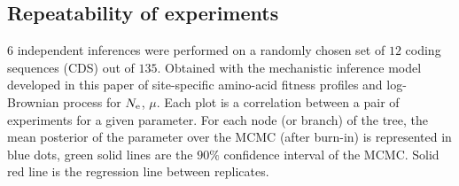 \documentclass{article}
\begin{document}
	\subsection{Repeatability of experiments}
	\label{subsec:repeatability-of-experiments-isopods}
	$6$ independent inferences were performed on a randomly chosen set of $12$ coding sequences ({CDS}) out of $135$.
	Obtained with the mechanistic inference model developed in this paper of site-specific amino-acid fitness profiles and log-Brownian process for $N_{\text{e}}$, $\mu$.
	Each plot is a correlation between a pair of experiments for a given parameter.
	For each node (or branch) of the tree, the mean {posterior} of the parameter over the {MCMC} (after burn-in) is represented in blue dots, green solid lines are the $90\%$ confidence interval of the {MCMC}.
	Solid red line is the regression line between replicates.
\end{document}
